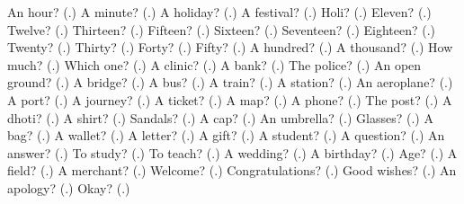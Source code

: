 \begin{tcolorbox}[breakable,colback=teal!4,colframe=teal!35!black,title={Before you move on}]
An hour? (\textbf{}.) A minute? (\textbf{}.) A holiday? (\textbf{}.) A festival? (\textbf{}.) Holi? (\textbf{}.) Eleven? (\textbf{}.) Twelve? (\textbf{}.) Thirteen? (\textbf{}.) Fifteen? (\textbf{}.) Sixteen? (\textbf{}.) Seventeen? (\textbf{}.) Eighteen? (\textbf{}.) Twenty? (\textbf{}.) Thirty? (\textbf{}.) Forty? (\textbf{}.) Fifty? (\textbf{}.) A hundred? (\textbf{}.) A thousand? (\textbf{}.) How much? (\textbf{}.) Which one? (\textbf{}.) A clinic? (\textbf{}.) A bank? (\textbf{}.) The police? (\textbf{}.) An open ground? (\textbf{}.) A bridge? (\textbf{}.) A bus? (\textbf{}.) A train? (\textbf{}.) A station? (\textbf{}.) An aeroplane? (\textbf{}.) A port? (\textbf{}.) A journey? (\textbf{}.) A ticket? (\textbf{}.) A map? (\textbf{}.) A phone? (\textbf{}.) The post? (\textbf{}.) A dhoti? (\textbf{}.) A shirt? (\textbf{}.) Sandals? (\textbf{}.) A cap? (\textbf{}.) An umbrella? (\textbf{}.) Glasses? (\textbf{}.) A bag? (\textbf{}.) A wallet? (\textbf{}.) A letter? (\textbf{}.) A gift? (\textbf{}.) A student? (\textbf{}.) A question? (\textbf{}.) An answer? (\textbf{}.) To study? (\textbf{}.) To teach? (\textbf{}.) A wedding? (\textbf{}.) A birthday? (\textbf{}.) Age? (\textbf{}.) A field? (\textbf{}.) A merchant? (\textbf{}.) Welcome? (\textbf{}.) Congratulations? (\textbf{}.) Good wishes? (\textbf{}.) An apology? (\textbf{}.) Okay? (\textbf{}.)
\end{tcolorbox}
